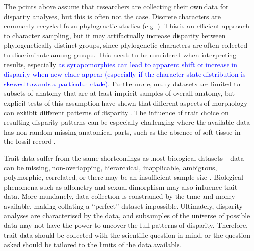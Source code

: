 \documentclass[12pt,letterpaper]{article}
\begin{document}
The points above assume that researchers are collecting their own data for disparity analyses, but this is often not the case.
Discrete characters are commonly recycled from phylogenetic studies (e.g. \citealt{Brusatte2008,Close2015}).
This is an efficient approach to character sampling, but it may artifactually increase disparity between phylogenetically distinct groups, since phylogenetic characters are often collected to discriminate among groups.
This needs to be considered when interpreting results, especially \textcolor{blue}{as synapomorphies can lead to apparent shift or increase in disparity when new clade appear (especially if the character-state distribution is skewed towards a particular clade).}
Furthermore, many datasets are limited to subsets of anatomy that are at least implicit samples of overall anatomy, but explicit tests of this assumption have shown that different aspects of morphology can exhibit different patterns of disparity \citep{Hopkins2017}.
The influence of trait choice on resulting disparity patterns can be especially challenging where the available data has non-random missing anatomical parts, such as the absence of soft tissue in the fossil record \citep{Deline2018}.

Trait data suffer from the same shortcomings as most biological datasets -- data can be missing, non-overlapping, hierarchical, inapplicable, ambiguous, polymorphic, correlated, or there may be an insufficient sample size \citep{Palci2018}.
Biological phenomena such as allometry and sexual dimorphism may also influence trait data.
More mundanely, data collection is constrained by the time and money available, making collating a ``perfect'' dataset impossible.
Ultimately, disparity analyses are characterised by the data, and subsamples of the universe of possible data may not have the power to uncover the full patterns of disparity.
Therefore, trait data should be collected with the scientific question in mind, or the question asked should be tailored to the limits of the data available.
\end{document}
